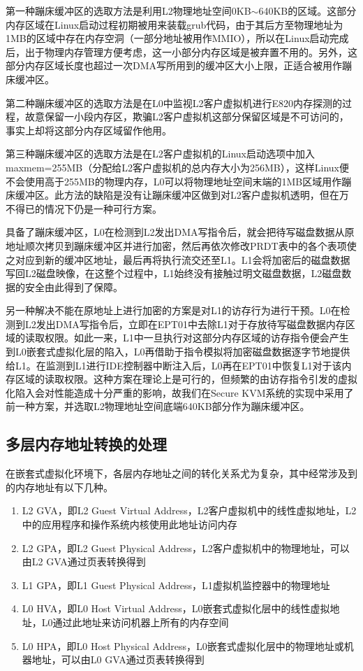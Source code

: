 第一种蹦床缓冲区的选取方法是利用L2物理地址空间0KB$\sim$640KB的区域。这部分内存区域在Linux启动过程初期被用来装载grub代码，由于其后方至物理地址为1MB的区域中存在内存空洞（一部分地址被用作MMIO），所以在Linux启动完成后，出于物理内存管理方便考虑，这一小部分内存区域是被弃置不用的。另外，这部分内存区域长度也超过一次DMA写所用到的缓冲区大小上限，正适合被用作蹦床缓冲区。

第二种蹦床缓冲区的选取方法是在L0中监视L2客户虚拟机进行E820内存探测的过程，故意保留一小段内存区，欺骗L2客户虚拟机这部分保留区域是不可访问的，事实上却将这部分内存区域留作他用。

第三种蹦床缓冲区的选取方法是在L2客户虚拟机的Linux启动选项中加入maxmem=255MB（分配给L2客户虚拟机的总内存大小为256MB），这样Linux便不会使用高于255MB的物理内存，L0可以将物理地址空间末端的1MB区域用作蹦床缓冲区。此方法的缺陷是没有让蹦床缓冲区做到对L2客户虚拟机透明，但在万不得已的情况下仍是一种可行方案。

具备了蹦床缓冲区，L0在检测到L2发出DMA写指令后，就会把待写磁盘数据从原地址顺次拷贝到蹦床缓冲区并进行加密，然后再依次修改PRDT表中的各个表项使之对应到新的缓冲区地址，最后再将执行流交还至L1。L1会将加密后的磁盘数据写回L2磁盘映像，在这整个过程中，L1始终没有接触过明文磁盘数据，L2磁盘数据的安全由此得到了保障。

另一种解决不能在原地址上进行加密的方案是对L1的访存行为进行干预。L0在检测到L2发出DMA写指令后，立即在EPT01中去除L1对于存放待写磁盘数据内存区域的读取权限。如此一来，L1中一旦执行对这部分内存区域的访存指令便会产生到L0嵌套式虚拟化层的陷入，L0再借助于指令模拟将加密磁盘数据逐字节地提供给L1。在监测到L1进行IDE控制器中断注入后，L0再在EPT01中恢复L1对于该内存区域的读取权限。这种方案在理论上是可行的，但频繁的由访存指令引发的虚拟化陷入会对性能造成十分严重的影响，故我们在Secure KVM系统的实现中采用了前一种方案，并选取L2物理地址空间底端640KB部分作为蹦床缓冲区。

\subsection{多层内存地址转换的处理}

在嵌套式虚拟化环境下，各层内存地址之间的转化关系尤为复杂，其中经常涉及到的内存地址有以下几种。

\begin{enumerate}
\item L2 GVA，即L2 Guest Virtual Address，L2客户虚拟机中的线性虚拟地址，L2中的应用程序和操作系统内核使用此地址访问内存
\item L2 GPA，即L2 Guest Physical Address，L2客户虚拟机中的物理地址，可以由L2 GVA通过页表转换得到
\item L1 GPA，即L1 Guest Physical Address，L1虚拟机监控器中的物理地址
\item L0 HVA，即L0 Host Virtual Address，L0嵌套式虚拟化层中的线性虚拟地址，L0通过此地址来访问机器上所有的内存空间
\item L0 HPA，即L0 Host Physical Address，L0嵌套式虚拟化层中的物理地址或机器地址，可以由L0 GVA通过页表转换得到
\end{enumerate}

